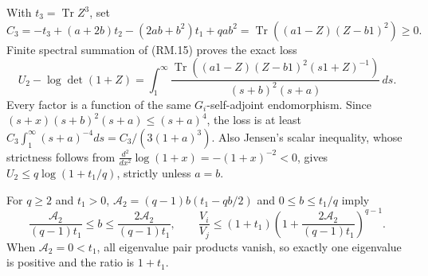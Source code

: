 \documentclass[11pt]{article}
\newcommand{\Tr}{\operatorname{Tr}}\newcommand{\im}{\operatorname{im}}
\begin{document}
With $t_3=\Tr Z^3$, set
\begin{equation}
 C_3=-t_3+(a+2b)t_2-(2ab+b^2)t_1+qab^2
 =\Tr((a1-Z)(Z-b1)^2)\ge0.\tag{RM.17}
\end{equation}
Finite spectral summation of (RM.15) proves the exact loss
\begin{equation}
 U_2-\log\det(1+Z)=\int_1^\infty
 \frac{\Tr((a1-Z)(Z-b1)^2(s1+Z)^{-1})}{(s+b)^2(s+a)}\,ds.
 \tag{RM.18}
\end{equation}
Every factor is a function of the same $G_i$-self-adjoint endomorphism.
Since $(s+x)(s+b)^2(s+a)\le(s+a)^4$, the loss is at least
$C_3\int_1^\infty(s+a)^{-4}ds=C_3/(3(1+a)^3)$.
Also Jensen's scalar inequality, whose strictness follows from
$\frac{d^2}{dx^2}\log(1+x)=-(1+x)^{-2}<0$, gives
$U_2\le q\log(1+t_1/q)$, strictly unless $a=b$.

For $q\ge2$ and $t_1>0$,
$\mathcal A_2=(q-1)b(t_1-qb/2)$ and $0\le b\le t_1/q$ imply
\begin{equation}
 \frac{\mathcal A_2}{(q-1)t_1}\le b
 \le\frac{2\mathcal A_2}{(q-1)t_1},\qquad
 \frac{V_i}{V_j}\le(1+t_1)
 \left(1+\frac{2\mathcal A_2}{(q-1)t_1}\right)^{q-1}.\tag{RM.19}
\end{equation}
When $\mathcal A_2=0<t_1$, all eigenvalue pair products vanish, so exactly
one eigenvalue is positive and the ratio is $1+t_1$.
\end{document}
